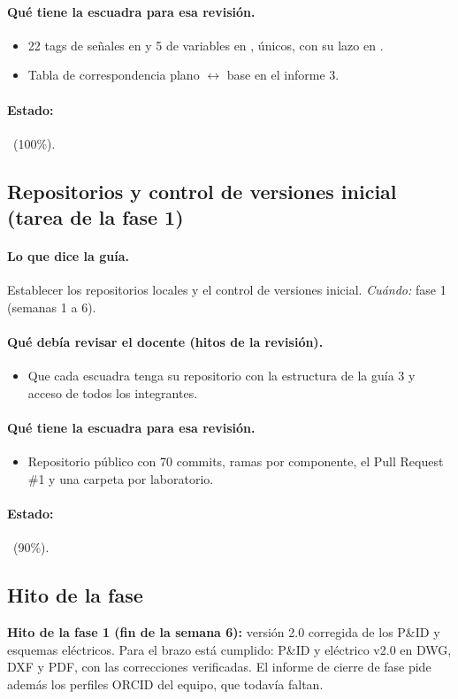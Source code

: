 \documentclass[a4paper,11pt]{article}
\begin{document}
\paragraph{Qué tiene la escuadra para esa revisión.}
\begin{itemize}
\item 22 tags de señales en  y 5 de variables en , únicos, con su lazo en .
\item Tabla de correspondencia plano $\leftrightarrow$ base en el informe 3.
\end{itemize}
\paragraph{Estado:} \cumple~(100\%).
\subsection{Repositorios y control de versiones inicial (tarea de la fase 1)}
\paragraph{Lo que dice la guía.} Establecer los repositorios locales y el control de versiones inicial. \textit{Cuándo:} fase 1 (semanas 1 a 6).
\paragraph{Qué debía revisar el docente (hitos de la revisión).}
\begin{itemize}
\item[$\square$] Que cada escuadra tenga su repositorio con la estructura de la guía 3 y acceso de todos los integrantes.
\end{itemize}
\paragraph{Qué tiene la escuadra para esa revisión.}
\begin{itemize}
\item Repositorio público con 70 commits, ramas por componente, el Pull Request \#1 y una carpeta por laboratorio.
\end{itemize}
\paragraph{Estado:} \parcial~(90\%).
\subsection{Hito de la fase}
\textbf{Hito de la fase 1 (fin de la semana 6):} versión 2.0 corregida de los P\&ID y esquemas eléctricos. Para el brazo está cumplido: P\&ID y eléctrico v2.0 en DWG, DXF y PDF, con las correcciones verificadas. El informe de cierre de fase pide además los perfiles ORCID del equipo, que todavía faltan.
\end{document}
